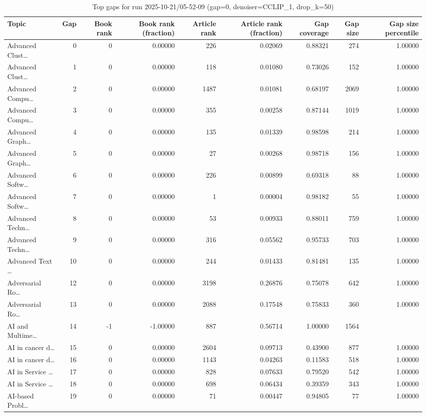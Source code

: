 \begin{table}
\caption{Top gaps for run 2025-10-21/05-52-09 (gap=0, denoiser=CCLIP\_1, drop\_k=50)}
\label{tab:best_run_gap0_2025_10_21_05_52_09}
\begin{tabular}{lrrrrrrrr}
\toprule
Topic & Gap & Book rank & Book rank (fraction) & Article rank & Article rank (fraction) & Gap coverage & Gap size & Gap size percentile \\
\midrule
Advanced Clust… & 0 & 0 & 0.00000 & 226 & 0.02069 & 0.88321 & 274 & 1.00000 \\
Advanced Clust… & 1 & 0 & 0.00000 & 118 & 0.01080 & 0.73026 & 152 & 1.00000 \\
Advanced Compu… & 2 & 0 & 0.00000 & 1487 & 0.01081 & 0.68197 & 2069 & 1.00000 \\
Advanced Compu… & 3 & 0 & 0.00000 & 355 & 0.00258 & 0.87144 & 1019 & 1.00000 \\
Advanced Graph… & 4 & 0 & 0.00000 & 135 & 0.01339 & 0.98598 & 214 & 1.00000 \\
Advanced Graph… & 5 & 0 & 0.00000 & 27 & 0.00268 & 0.98718 & 156 & 1.00000 \\
Advanced Softw… & 6 & 0 & 0.00000 & 226 & 0.00899 & 0.69318 & 88 & 1.00000 \\
Advanced Softw… & 7 & 0 & 0.00000 & 1 & 0.00004 & 0.98182 & 55 & 1.00000 \\
Advanced Techn… & 8 & 0 & 0.00000 & 53 & 0.00933 & 0.88011 & 759 & 1.00000 \\
Advanced Techn… & 9 & 0 & 0.00000 & 316 & 0.05562 & 0.95733 & 703 & 1.00000 \\
Advanced Text … & 10 & 0 & 0.00000 & 244 & 0.01433 & 0.81481 & 135 & 1.00000 \\
Adversarial Ro… & 12 & 0 & 0.00000 & 3198 & 0.26876 & 0.75078 & 642 & 1.00000 \\
Adversarial Ro… & 13 & 0 & 0.00000 & 2088 & 0.17548 & 0.75833 & 360 & 1.00000 \\
AI and Multime… & 14 & -1 & -1.00000 & 887 & 0.56714 & 1.00000 & 1564 &  \\
AI in cancer d… & 15 & 0 & 0.00000 & 2604 & 0.09713 & 0.43900 & 877 & 1.00000 \\
AI in cancer d… & 16 & 0 & 0.00000 & 1143 & 0.04263 & 0.11583 & 518 & 1.00000 \\
AI in Service … & 17 & 0 & 0.00000 & 828 & 0.07633 & 0.79520 & 542 & 1.00000 \\
AI in Service … & 18 & 0 & 0.00000 & 698 & 0.06434 & 0.39359 & 343 & 1.00000 \\
AI-based Probl… & 19 & 0 & 0.00000 & 71 & 0.00447 & 0.94805 & 77 & 1.00000 \\

\end{tabular}
\end{table}
